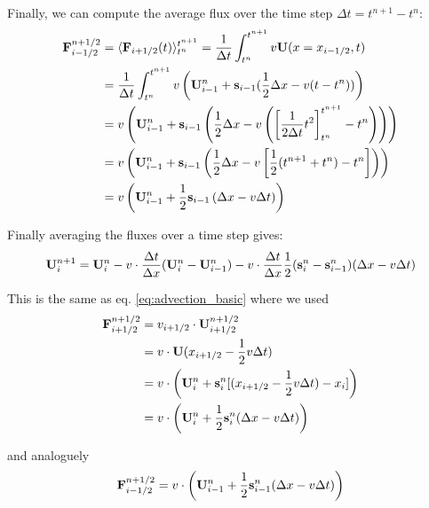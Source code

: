 Finally, we can compute the average flux over the time step $\Delta t = t^{n+1} - t^{n}$:
\begin{align}
	\mathbf{F}_{i-1/2}^{n+1/2} 
	&= \langle \mathbf{F}_{i+1/2}(t)\rangle _{t^n} ^ {t^{n+1}} 
	= \frac{1}{\Delta t} \int_{t^n}^{t^{n+1}} v \mathbf{U}(x 
	= x_{i-1/2}, t) \\
	&= \frac{1}{\Delta t} \int_{t^n}^{t^{n+1}} v \left( \mathbf{U}_{i-1}^n + \mathbf{s}_{i-1} (\frac{1}{2} \Delta x - v (t - t^n)) \right) \\
	&= v \left( \mathbf{U}_{i-1}^n  + \mathbf{s}_{i-1} \left( \frac{1}{2} \Delta x - v \left( \left[ \frac{1}{2 \Delta t} t^2 \right]_{t^n}^{t^{n+1}} - t^n \right)  \right) \right) \\
	&= v \left( \mathbf{U}_{i-1}^n  + \mathbf{s}_{i-1} \left( \frac{1}{2} \Delta x - v \left[ \frac{1}{2} (t^{n+1} + t^n) - t^n \right] \right) \right) \\
	&= v \left( \mathbf{U}_{i-1}^n  + \frac{1}{2} \mathbf{s}_{i-1} \left(\Delta x - v \Delta t \right) \right)
\end{align}



Finally averaging the fluxes over a time step gives:
\begin{equation}
	\mathbf{U}_i^{n+1} = \mathbf{U}_i^n - v \cdot \frac{\Delta t}{\Delta x} ( \mathbf{U}_i ^n - \mathbf{U}_{i-1}^n) - v \cdot \frac{\Delta t}{\Delta x} \frac{1}{2} (\mathbf{s}_i^n - \mathbf{s}_{i-1}^n)(\Delta x - v \Delta t)
\end{equation}

This is the same as eq. \ref{eq:advection_basic} where we used
\begin{align*}
	\mathbf{F}_{i + 1/2}^{n+1/2} 
		& = v_{i+1/2} \cdot  \mathbf{U}_{i+1/2} ^{n + 1/2} \\
		& = v \cdot \mathbf{U}(x_{i+1/2} - \frac{1}{2} v \Delta t) \\
		& = v \cdot \left( \mathbf{U}_i^n + \mathbf{s}_i^n [(x_{i+1/2} - \frac{1}{2} v \Delta t) - x_i ]  \right)\\
		& = v \cdot \left( \mathbf{U}_i^n + \frac{1}{2} \mathbf{s}_i^n (\Delta x -  v \Delta t)  \right)\\
\end{align*}

and analoguely
\begin{align*}
	\mathbf{F}_{i - 1/2}^{n+1/2} 
		& = v \cdot \left( \mathbf{U}_{i-1}^n + \frac{1}{2} \mathbf{s}_{i-1}^n (\Delta x -  v \Delta t)  \right)\\
\end{align*}








